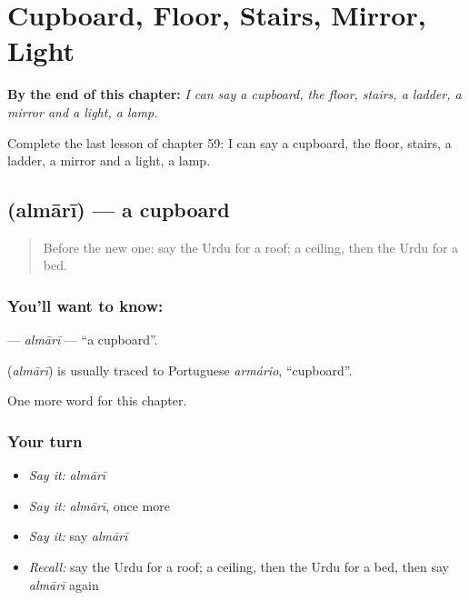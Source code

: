 
\chapter{Cupboard, Floor, Stairs, Mirror, Light}
\label{ch:ur-cupboard-floor-stairs-mirror-light}

\begin{chapteropening}
\textbf{By the end of this chapter:} \emph{I can say a cupboard, the floor, stairs, a ladder, a mirror and a light, a lamp.}

Complete the last lesson of chapter 59: I can say a cupboard, the floor, stairs, a ladder, a mirror and a light, a lamp.
\end{chapteropening}

\section[\texorpdfstring{\ur{الماری} (almārī)}{الماری (almārī)}]{ (almārī) — a cupboard}

\label{lesson:UR-C59-almari}



\begin{quote}
Before the new one: say the Urdu for a roof; a ceiling, then the Urdu for a bed.
\end{quote}

\subsection*{You'll want to know: }
\textbf{} — \emph{almārī} — \textquotedblleft{}a cupboard\textquotedblright{}.

\begin{cousinweb}
\textbf{} (\emph{almārī}) is usually traced to Portuguese \emph{armário}, \textquotedblleft{}cupboard\textquotedblright{}.
\end{cousinweb}

\begin{grammarlens}[title={What you've built}]
One more word for this chapter.
\end{grammarlens}

\subsection*{Your turn}
\begin{itemize}
\raggedright
  \item \emph{Say it:} \emph{almārī}
  \item \emph{Say it:} \emph{almārī}, once more
  \item \emph{Say it:} say \emph{almārī}
  \item \emph{Recall:} say the Urdu for a roof; a ceiling, then the Urdu for a bed, then say \emph{almārī} again
\end{itemize}

